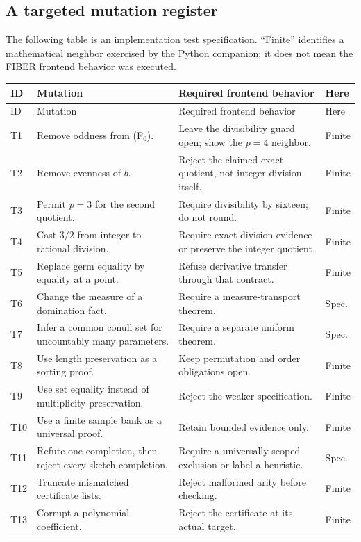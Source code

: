 \documentclass[11pt,letterpaper]{article}
\theoremstyle{definition}\newtheorem{definition}[theorem]{Definition}
\begin{document}
\subsection{A targeted mutation register}
The following table is an implementation test specification. ``Finite'' identifies a mathematical neighbor exercised by the Python companion; it does not mean the FIBER frontend behavior was executed.
\small
\begin{longtable}{@{}L{0.42in}L{2.13in}L{2.92in}L{0.48in}@{}}
\toprule
ID & Mutation & Required frontend behavior & Here\\\midrule
\endfirsthead
\toprule ID & Mutation & Required frontend behavior & Here\\\midrule
\endhead
T1 & Remove oddness from (F$_0$). & Leave the divisibility guard open; show the $p=4$ neighbor. & Finite\\
T2 & Remove evenness of $b$. & Reject the claimed exact quotient, not integer division itself. & Finite\\
T3 & Permit $p=3$ for the second quotient. & Require divisibility by sixteen; do not round. & Finite\\
T4 & Cast $3/2$ from integer to rational division. & Require exact division evidence or preserve the integer quotient. & Finite\\
T5 & Replace germ equality by equality at a point. & Refuse derivative transfer through that contract. & Finite\\
T6 & Change the measure of a domination fact. & Require a measure-transport theorem. & Spec.\\
T7 & Infer a common conull set for uncountably many parameters. & Require a separate uniform theorem. & Spec.\\
T8 & Use length preservation as a sorting proof. & Keep permutation and order obligations open. & Finite\\
T9 & Use set equality instead of multiplicity preservation. & Reject the weaker specification. & Finite\\
T10 & Use a finite sample bank as a universal proof. & Retain bounded evidence only. & Finite\\
T11 & Refute one completion, then reject every sketch completion. & Require a universally scoped exclusion or label a heuristic. & Spec.\\
T12 & Truncate mismatched certificate lists. & Reject malformed arity before checking. & Finite\\
T13 & Corrupt a polynomial coefficient. & Reject the certificate at its actual target. & Finite\\

\end{longtable}
\end{document}
